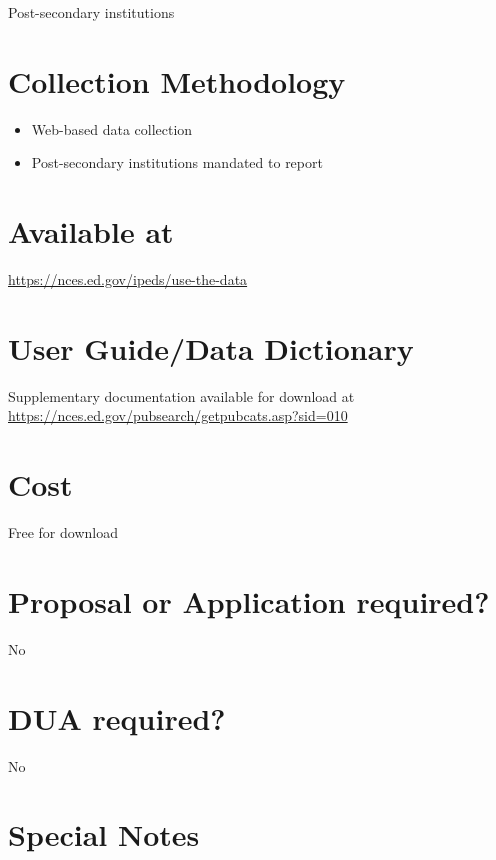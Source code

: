 \documentclass[
]{book}
\providecommand{\tightlist}{%
  \setlength{\itemsep}{0pt}\setlength{\parskip}{0pt}}
\begin{document}
Post-secondary institutions

\hypertarget{collection-methodology-33}{%
\section{Collection Methodology}\label{collection-methodology-33}}

\begin{itemize}
\tightlist
\item
  Web-based data collection
\item
  Post-secondary institutions mandated to report
\end{itemize}

\hypertarget{available-at-33}{%
\section{Available at}\label{available-at-33}}

\url{https://nces.ed.gov/ipeds/use-the-data}

\hypertarget{user-guidedata-dictionary-33}{%
\section{User Guide/Data Dictionary}\label{user-guidedata-dictionary-33}}

Supplementary documentation available for download at \url{https://nces.ed.gov/pubsearch/getpubcats.asp?sid=010}

\hypertarget{cost-33}{%
\section{Cost}\label{cost-33}}

Free for download

\hypertarget{proposal-or-application-required-33}{%
\section{Proposal or Application required?}\label{proposal-or-application-required-33}}

No

\hypertarget{dua-required-33}{%
\section{DUA required?}\label{dua-required-33}}

No

\hypertarget{special-notes-33}{%
\section{Special Notes}\label{special-notes-33}}
\end{document}
